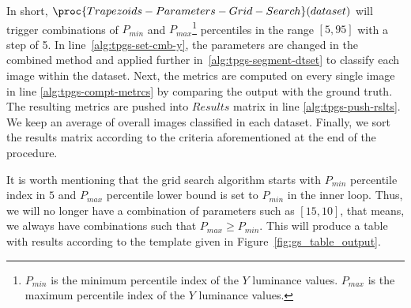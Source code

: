 In short, $\proc{Trapezoids-Parameters-Grid-Search}(dataset)$ will trigger combinations of $P_{min}$ and $P_{max}$\footnote{$P_{min}$ is the minimum percentile index of the $Y$ luminance values. $P_{max}$ is the maximum percentile index of the $Y$ luminance values.} percentiles in the range $[5, 95]$ with a step of 5. In line~\ref{alg:tpgs-set-cmb-y}, the parameters are changed in the combined method and applied further in~\ref{alg:tpgs-segment-dtset} to classify each image within the dataset. Next, the metrics are computed on every single image in line \ref{alg:tpgs-compt-metrcs} by comparing the output with the ground truth. The resulting metrics are pushed into $Results$ matrix in line \ref{alg:tpgs-push-rslts}. We keep an average of overall images classified in each dataset. Finally, we sort the results matrix according to the criteria aforementioned at the end of the procedure.

It is worth mentioning that the grid search algorithm starts with $P_{min}$ percentile index in $5$ and $P_{max}$ percentile lower bound is set to $P_{min}$ in the inner loop. Thus, we will no longer have a combination of parameters such as $[15, 10]$, that means, we always have combinations such that $P_{max} \geq P_{min}$. This will produce a table with results according to the template given in Figure~\ref{fig:gs_table_output}.

